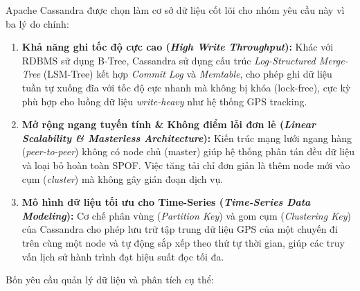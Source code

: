 Apache Cassandra được chọn làm cơ sở dữ liệu cốt lõi cho nhóm yêu cầu này vì ba lý do chính:
\begin{enumerate}
    \item \textbf{Khả năng ghi tốc độ cực cao (\textit{High Write Throughput}):} Khác với RDBMS sử dụng B-Tree, Cassandra sử dụng cấu trúc \textit{Log-Structured Merge-Tree} (LSM-Tree) kết hợp \textit{Commit Log} và \textit{Memtable}, cho phép ghi dữ liệu tuần tự xuống đĩa với tốc độ cực nhanh mà không bị khóa (lock-free), cực kỳ phù hợp cho luồng dữ liệu \textit{write-heavy} như hệ thống GPS tracking.
    \item \textbf{Mở rộng ngang tuyến tính \& Không điểm lỗi đơn lẻ (\textit{Linear Scalability \& Masterless Architecture}):} Kiến trúc mạng lưới ngang hàng (\textit{peer-to-peer}) không có node chủ (master) giúp hệ thống phân tán đều dữ liệu và loại bỏ hoàn toàn SPOF. Việc tăng tải chỉ đơn giản là thêm node mới vào cụm (\textit{cluster}) mà không gây gián đoạn dịch vụ.
    \item \textbf{Mô hình dữ liệu tối ưu cho Time-Series (\textit{Time-Series Data Modeling}):} Cơ chế phân vùng (\textit{Partition Key}) và gom cụm (\textit{Clustering Key}) của Cassandra cho phép lưu trữ tập trung dữ liệu GPS của một chuyến đi trên cùng một node và tự động sắp xếp theo thứ tự thời gian, giúp các truy vấn lịch sử hành trình đạt hiệu suất đọc tối đa.
\end{enumerate}

Bốn yêu cầu quản lý dữ liệu và phân tích cụ thể:

